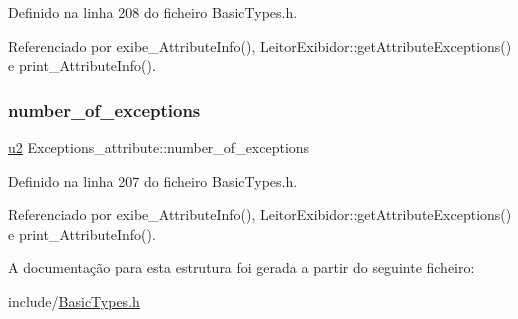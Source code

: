 Definido na linha 208 do ficheiro Basic\+Types.\+h.



Referenciado por exibe\+\_\+\+Attribute\+Info(), Leitor\+Exibidor\+::get\+Attribute\+Exceptions() e print\+\_\+\+Attribute\+Info().

\mbox{\label{structExceptions__attribute_af9f38fbc43eadcb56658f90e8743c90b}} 
\subsubsection{\texorpdfstring{number\+\_\+of\+\_\+exceptions}{number\_of\_exceptions}}
{\footnotesize\ttfamily \hyperlink{BasicTypes_8h_a732cde1300aafb73b0ea6c2558a7a54f}{u2} Exceptions\+\_\+attribute\+::number\+\_\+of\+\_\+exceptions}



Definido na linha 207 do ficheiro Basic\+Types.\+h.



Referenciado por exibe\+\_\+\+Attribute\+Info(), Leitor\+Exibidor\+::get\+Attribute\+Exceptions() e print\+\_\+\+Attribute\+Info().



A documentação para esta estrutura foi gerada a partir do seguinte ficheiro\+:\begin{DoxyCompactItemize}
\item 
include/\hyperlink{BasicTypes_8h}{Basic\+Types.\+h}\end{DoxyCompactItemize}
